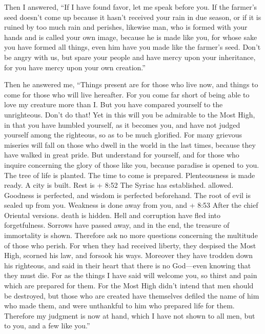  Then I answered, ``If I have found favor, let me speak
before you.  If the farmer's seed doesn't come up because
it hasn't received your rain in due season, or if it is ruined by too
much rain and perishes,  likewise man, who is formed with
your hands and is called your own image, because he is made like you,
for whose sake you have formed all things, even him have you made like
the farmer's seed.  Don't be angry with us, but spare your
people and have mercy upon your inheritance, for you have mercy upon
your own creation.''

 Then he answered me, ``Things present are for those who
live now, and things to come for those who will live hereafter.
 For you come far short of being able to love my creature
more than I. But you have compared yourself to the unrighteous. Don't do
that!  Yet in this will you be admirable to the Most High,
 in that you have humbled yourself, as it becomes you, and
have not judged yourself among the righteous, so as to be much
glorified.  For many grievous miseries will fall on those
who dwell in the world in the last times, because they have walked in
great pride.  But understand for yourself, and for those
who inquire concerning the glory of those like you, 
because paradise is opened to you. The tree of life is planted. The time
to come is prepared. Plenteousness is made ready. A city is built. Rest
is + 8:52 The Syriac has established. allowed. Goodness is perfected,
and wisdom is perfected beforehand.  The root of evil is
sealed up from you. Weakness is done away from you, and + 8:53 After the
chief Oriental versions. death is hidden. Hell and corruption have fled
into forgetfulness.  Sorrows have passed away, and in the
end, the treasure of immortality is shown.  Therefore ask
no more questions concerning the multitude of those who perish.
 For when they had received liberty, they despised the Most
High, scorned his law, and forsook his ways.  Moreover they
have trodden down his righteous,  and said in their heart
that there is no God---even knowing that they must die. 
For as the things I have said will welcome you, so thirst and pain which
are prepared for them. For the Most High didn't intend that men should
be destroyed,  but those who are created have themselves
defiled the name of him who made them, and were unthankful to him who
prepared life for them.  Therefore my judgment is now at
hand,  which I have not shown to all men, but to you, and a
few like you.''

